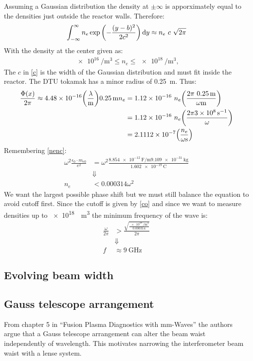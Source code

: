 Assuming a Gaussian distribution the density at \(\pm\infty\) is apporximately equal to the densities just outside the reactor walls. Therefore:
\begin{align}
  \int_{-\infty}^{\infty}n_e \exp\pqty{-\frac{(y-b)^2}{2c^2}}\dd{y} \approx n_e\ c\ \sqrt{2\pi}\label{c}
\end{align}
With the density at the center given as:
\begin{align}
  \SI{e16}{\per\meter\cubed} \leq n_e \leq \SI{e18}{\per\meter\cubed},
\end{align}
The \(c\) in \cref{c} is the width of the Gaussian distribution and must fit inside the reactor. The DTU tokamak has a minor radius of \SI{0.25}{\meter}. Thus:
\begin{align}
  \frac{\Phi(x)}{2\pi} \approx 4.48\times 10^{-16}\pqty{\frac{\lambda}{\si{\meter}}}\SI{0.25}{\meter}n_e &= 1.12\times 10^{-16}\ n_e \pqty{\frac{2\pi\ \SI{0.25}{\meter}}{\omega\si{\meter}}}\\
  &= 1.12\times 10^{-16}\ n_e\pqty{\frac{2\pi\SI{3e8}{\per\second}}{\omega}} \\
  &= 2.1112\times 10^{-7}\pqty{\frac{n_e}{\omega\si{\second}}}
\end{align}
Remembering \cref{nenc}:
\begin{align}
  \omega^2\frac{\epsilon_0\cdot m_{e0}}{e^2} &= \omega^2\frac{\SI{8.854e-12}{\farad\per\meter}\SI{9.109e-31}{\kilo\gram}}{\SI{1.602e-19}{\coulomb}}\\
  &\Downarrow\nonumber\\
  n_e &< 0.000314\omega^2 \label{co}
\end{align}
We want the largest possible phase shift but we must still balance the equation to avoid cutoff first.
Since the cutoff is given by \cref{co} and since we want to measure densities up to \SI{e18}{\per\meter\cubed} the minimum frequency of the wave is:
\begin{align}
  \frac{\omega}{2\pi} &> \frac{\sqrt{\frac{\SI{e18}{\per\meter\cubed}}{0.000314}}}{2\pi}\\
  &\Downarrow\nonumber\\
  f &\approx \SI{9}{\giga\hertz}
\end{align}

\subsection{Evolving beam width}

\subsection{Gauss telescope arrangement}
From chapter 5 in ``Fusion Plasma Diagnostics with mm-Waves''\cite{PlasmaDiagnosis} the authors argue that a Gauss telescope arrangement can alter the beam waist independently of wavelength. This motivates narrowing the interferometer beam waist with a lense system.
